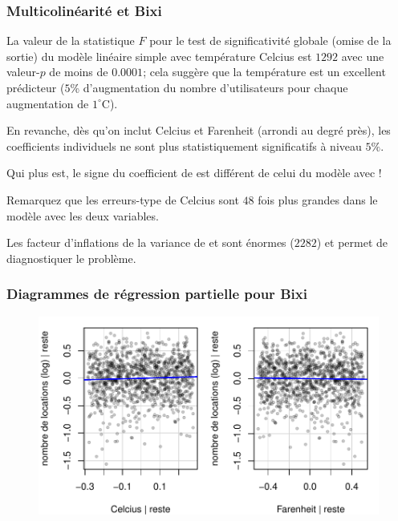 \documentclass[xcolor={dvipsnames}]{beamer}
\begin{document}
\begin{frame}
 \frametitle{Multicolinéarité et Bixi}
 \bi 
  \item La valeur de la statistique $F$ pour le test de significativité globale (omise de la sortie) du modèle linéaire simple avec température Celcius est $1292$ avec une valeur-$p$ de moins de $0.0001$; cela suggère que la température est un excellent prédicteur ($5$\% d'augmentation du nombre d'utilisateurs pour chaque augmentation de $1^{\circ}$C).
 \item En revanche, dès qu'on inclut Celcius et Farenheit (arrondi au degré près), les coefficients individuels ne sont plus statistiquement significatifs à niveau $5\%$. 
 \item Qui plus est, le signe du coefficient de  est différent de celui du modèle avec !
   \item Remarquez que les erreurs-type de Celcius sont $48$ fois plus grandes dans le modèle avec les deux variables.
 \item Les facteur d'inflations de la variance  de  et  sont énormes ($2282$) et permet de diagnostiquer le problème. 
\ei
\end{frame}
\begin{frame}[fragile]
 \frametitle{Diagrammes de régression partielle pour Bixi}
 
 \begin{figure}
  \centering 
  \includegraphics[width = \textwidth]{img/c2/03-linreg-avplot_temp_fr.pdf}
 \end{figure}

\end{frame}
\end{document}

